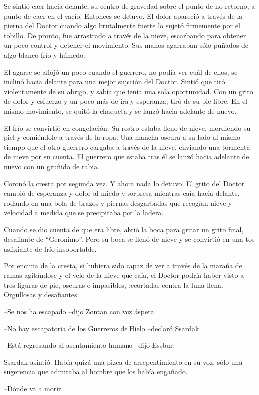 Se sintió caer hacia delante, su centro de gravedad sobre el punto de no retorno, a punto de caer en el vacío. Entonces se detuvo. El dolor apareció a través de la pierna del Doctor cuando algo brutalmente fuerte lo sujetó firmemente por el tobillo. De pronto, fue arrastrado a través de la nieve, escarbando para obtener un poco control y detener el movimiento. Sus manos agarraban sólo puñados de algo blanco frío y húmedo.



El agarre se aflojó un poco cuando el guerrero, no podía ver cuál de ellos, se inclinó hacia delante para una mejor sujeción del Doctor. Sintió que tiró violentamente de su abrigo, y sabía que tenía una sola oportunidad. Con un grito de dolor y esfuerzo y un poco más de ira y esperanza, tiró de su pie libre. En el mismo movimiento, se quitó la chaqueta y se lanzó hacia adelante de nuevo.



El frío se convirtió en congelación. Su rostro estaba lleno de nieve, mordiendo su piel y comiéndole a través de la ropa. Una mancha oscura a su lado al mismo tiempo que el otro guerrero cargaba a través de la nieve, enviando una tormenta de nieve por su cuenta. El guerrero que estaba tras él se lanzó hacia adelante de nuevo con un gruñido de rabia.



Coronó la cresta por segunda vez. Y ahora nada lo detuvo. El grito del Doctor cambió de esperanza y dolor al miedo y sorpresa mientras caía hacia delante, rodando en una bola de brazos y piernas desgarbadas que recogían nieve y velocidad a medida que se precipitaba por la ladera.



Cuando se dio cuenta de que era libre, abrió la boca para gritar un grito final, desafiante de “Geronimo”. Pero su boca se llenó de nieve y se convirtió en una tos asfixiante de frío insoportable.



\mbox{}



Por encima de la cresta, si hubiera sido capaz de ver a través de la maraña de ramas agitándose y el velo de la nieve que caía, el Doctor podría haber visto a tres figuras de pie, oscuras e impasibles, recortadas contra la luna llena. Orgullosas y desafiantes.



--Se nos ha escapado --dijo Zontan con voz áspera.



--No hay escapatoria de los Guerreros de Hielo --declaró Ssardak.



--Está regresando al asentamiento humano --dijo Essbur.



Ssardak asintió. Había quizá una pizca de arrepentimiento en su voz, sólo una sugerencia que admiraba al hombre que los había engañado.


--Dónde va a morir.
